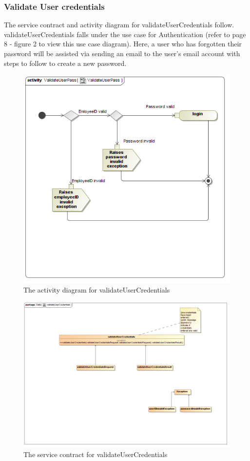\documentclass[a4paper,12pt]{report}
\begin{document}
\subsubsection{Validate User credentials }
The service contract and activity diagram for validateUserCredentials follow. validateUserCredentials falls under the use case for Authentication (refer to page 8 - figure 2 to view this use case diagram). Here, a user who has forgotten their password will be assisted via sending an email to the user's email account with steps to follow to create a new password.
\begin{figure}[H]
  \centering
    \includegraphics[width=1.0\textwidth]{../images/ValidateUserPassActivity.png}
    \caption{The activity diagram for validateUserCredentials} 
\end{figure}
\begin{figure}[H]
  \centering
    \includegraphics[width=1.0\textwidth]{../images/validateUserCredentials.png}
    \caption{The service contract for validateUserCredentials} 
\end{figure}
\end{document}
